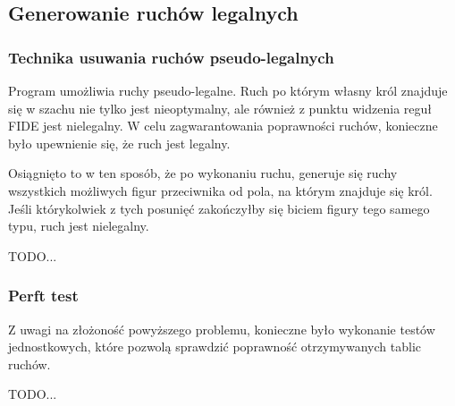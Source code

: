 \subsection{Generowanie ruchów legalnych}
\label{subsec:generowanie-ruchow-legalnych}

\subsubsection{Technika usuwania ruchów pseudo-legalnych}

Program umożliwia ruchy pseudo-legalne.
Ruch po którym własny król znajduje się w szachu nie tylko jest nieoptymalny, ale również z punktu widzenia reguł FIDE jest nielegalny.
W celu zagwarantowania poprawności ruchów, konieczne było upewnienie się, że ruch jest legalny.

Osiągnięto to w ten sposób, że po wykonaniu ruchu, generuje się ruchy wszystkich możliwych figur przeciwnika od pola, na którym znajduje się król.
Jeśli którykolwiek z tych posunięć zakończyłby się biciem figury tego samego typu, ruch jest nielegalny.

TODO...

\subsubsection{Perft test}

Z uwagi na złożoność powyższego problemu, konieczne było wykonanie testów jednostkowych, które pozwolą sprawdzić poprawność otrzymywanych tablic ruchów.

TODO...
